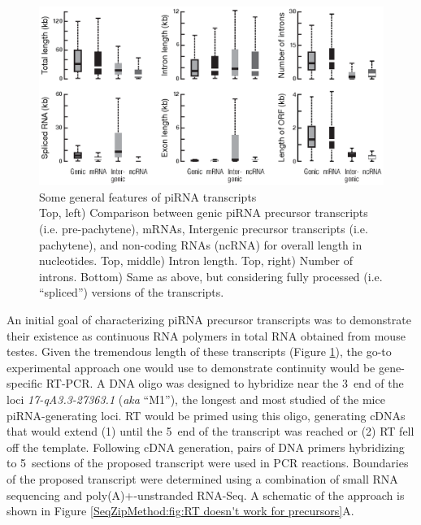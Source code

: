     \begin{figure} %
      \centering 
      \includegraphics{Figures/SeqZipMethod/piRNAPrecusorTXFeatures.eps}
      \caption[Some general features of piRNA transcripts]
      {
        Some general features of piRNA transcripts\\[0.25cm]
        Top, left) Comparison between genic piRNA precursor transcripts (i.e. pre-pachytene), mRNAs, Intergenic precursor transcripts (i.e. pachytene), and non-coding RNAs (ncRNA) for overall length in nucleotides. Top, middle) Intron length. Top, right) Number of introns. Bottom) Same as above, but considering fully processed (i.e. ``spliced'') versions of the transcripts.
        }
      \label{SeqZipMethod:fig:piRNA precusor Tx features}
      \end{figure}

    An initial goal of characterizing piRNA precursor transcripts was to demonstrate their existence as continuous RNA polymers in total RNA obtained from mouse testes.  Given the tremendous length of these transcripts (Figure \ref{SeqZipMethod:fig:piRNA precusor Tx features}), the go-to experimental approach one would use to demonstrate continuity would be gene-specific RT-PCR. A DNA oligo was designed to hybridize near the 3\textprime~end of the loci \textit{17-qA3.3-27363.1} (\textit{aka} ``M1''), the longest and most studied of the mice piRNA-generating loci. RT would be primed using this oligo, generating cDNAs that would extend (1) until the 5\textprime~end of the transcript was reached or (2) RT fell off the template. Following cDNA generation, pairs of DNA primers hybridizing to 5\textprime~sections of the proposed transcript were used in PCR reactions. Boundaries of the proposed transcript were determined using a combination of small RNA sequencing and poly(A)+-unstranded RNA-Seq. A schematic of the approach is shown in Figure \ref{SeqZipMethod:fig:RT doesn't work for precursors}A.

